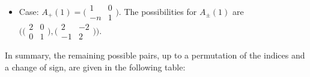 \documentclass[10pt,a4paper]{amsart}
\numberwithin{equation}{section}
\theoremstyle{definition}
\begin{document}
\begin{itemize}
\item Case: $A_+(1) =
\bigl(\begin{smallmatrix}
 1 & 0 \\
 -n & 1
 \end{smallmatrix}\bigr)$.
 The possibilities for $A_\pm(1)$ are
$\bigl( \bigl(\begin{smallmatrix}
 2 & 0 \\
 0 & 1
 \end{smallmatrix}\bigr),
\bigl(\begin{smallmatrix}
 2 & -2 \\
 -1 & 2
 \end{smallmatrix}\bigr)\bigr)$.
\end{itemize}

In summary, the remaining possible pairs, up to a permutation of the indices and a change of sign,
are given in the following table:
\end{document}
